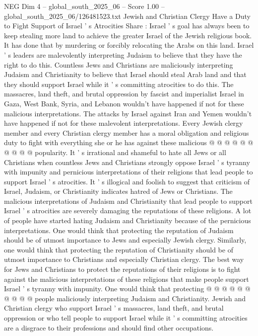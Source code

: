 \begin{textsample}{NEG Dim 4 – global\_south\_2025\_06 – Score 1.00 – global\_south\_2025\_06/126481523.txt}  \label{ex:f4_neg_101}
Jewish and Christian Clergy Have a Duty to Fight Support of Israel ' s Atrocities Share : Israel ' s goal has always been to keep stealing more land to achieve the greater Israel of the Jewish religious book.
It has done that by murdering or forcibly relocating the Arabs on this land.
Israel ' s leaders are malevolently interpreting Judaism to believe that they have the right to do this.
Countless Jews and Christians are maliciously interpreting Judaism and Christianity to believe that Israel should steal Arab land and that they should support Israel while it ' s committing atrocities to do this.
The massacres, land theft, and brutal oppression by fascist and imperialist Israel in Gaza, West Bank, Syria, and Lebanon wouldn't have happened if not for these malicious interpretations.
The attacks by Israel against Iran and Yemen wouldn't have happened if not for these malevolent interpretations.
Every Jewish clergy member and every Christian clergy member has a moral obligation and religious duty to fight with everything she or he has against these malicious @ @ @ @ @ @ @ @ @ @ popularity.
It ' s irrational and shameful to hate all Jews or all Christians when countless Jews and Christians strongly oppose Israel ' s tyranny with impunity and pernicious interpretations of their religions that lead people to support Israel ' s atrocities.
It ' s illogical and foolish to suggest that criticism of Israel, Judaism, or Christianity indicates hatred of Jews or Christians.
The malicious interpretations of Judaism and Christianity that lead people to support Israel ' s atrocities are severely damaging the reputations of these religions.
A lot of people have started hating Judaism and Christianity because of the pernicious interpretations.
One would think that protecting the reputation of Judaism should be of utmost importance to Jews and especially Jewish clergy.
Similarly, one would think that protecting the reputation of Christianity should be of utmost importance to Christians and especially Christian clergy.
The best way for Jews and Christians to protect the reputations of their religions is to fight against the malicious interpretations of these religions that make people support Israel ' s tyranny with impunity.
One would think that protecting @ @ @ @ @ @ @ @ @ @ people maliciously interpreting Judaism and Christianity.
Jewish and Christian clergy who support Israel ' s massacres, land theft, and brutal oppression or who tell people to support Israel while it ' s committing atrocities are a disgrace to their professions and should find other occupations.

\end{textsample}

